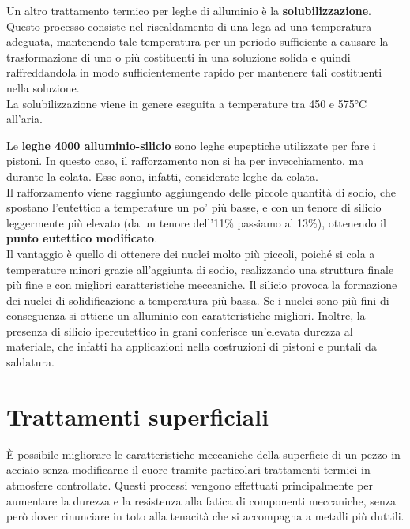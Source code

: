Un altro trattamento termico per leghe di alluminio è la \textbf{solubilizzazione}. Questo processo consiste nel riscaldamento di una lega ad una temperatura adeguata, mantenendo tale temperatura per un periodo sufficiente a causare la trasformazione di uno o più costituenti in una soluzione solida e quindi raffreddandola in modo sufficientemente rapido per mantenere tali costituenti nella soluzione.\\
La solubilizzazione viene in genere eseguita a temperature tra 450 e 575°C all’aria.

Le \textbf{leghe 4000 alluminio-silicio} sono leghe eupeptiche utilizzate per fare i pistoni. In questo caso, il rafforzamento non si ha per invecchiamento, ma durante la colata. Esse sono, infatti, considerate leghe da colata.\\
Il rafforzamento viene raggiunto aggiungendo delle piccole quantità di sodio, che spostano l’eutettico a temperature un po’ più basse, e con un tenore di silicio leggermente più elevato (da un tenore dell’11\% passiamo al 13\%), ottenendo il \textbf{punto eutettico modificato}.\\
Il vantaggio è quello di ottenere dei nuclei molto più piccoli, poiché si cola a temperature minori grazie all’aggiunta di sodio, realizzando una struttura finale più fine e con migliori caratteristiche meccaniche. Il silicio provoca la formazione dei nuclei di solidificazione a temperatura più bassa. Se i nuclei sono più fini di conseguenza si ottiene un alluminio con caratteristiche migliori. Inoltre, la presenza di silicio ipereutettico in grani conferisce un’elevata durezza al materiale, che infatti ha applicazioni nella costruzioni di pistoni e puntali da saldatura.\\

\section{Trattamenti superficiali}
È possibile migliorare le caratteristiche meccaniche della superficie di un pezzo in acciaio senza modificarne il cuore tramite particolari trattamenti termici in atmosfere controllate. Questi processi vengono effettuati principalmente per aumentare la durezza e la resistenza alla fatica di componenti meccaniche, senza però dover rinunciare in toto alla tenacità che si accompagna a metalli più duttili.

